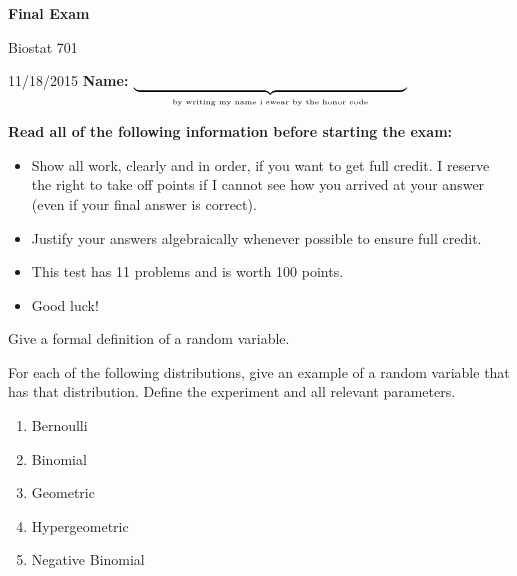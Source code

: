 \documentclass{article}
\begin{document}

\centerline{\huge \bf Final Exam}        %
\vfill \vfill
   
Biostat 701                               %

11/18/2015 \hfill                             %
{\bf Name: } $\underbrace{\hspace{2.7in}}_{\mbox{\tiny by writing my 
                                           name i swear by the honor code}}$
\vfill \vfill \vfill

{\bf Read all of the following information before starting the exam:}
\vspace{1pc}

\begin{itemize}                        %
	\item  Show all work, clearly and in order, if you want to get full
	credit.  I reserve the right to take off points if I cannot see how you 
	arrived at your answer (even if your final answer is correct).
	
	\item Justify your answers algebraically whenever possible to ensure 
	full credit. 
		
	\item  This test has 11 problems  %
	and is worth 100 points.           %
	
	\item  Good luck!
\end{itemize}

\vfill \vfill \vfill

\clearpage


\begin{problem}{5}

Give a formal definition of a random variable.
\vspace{1pc}

\end{problem}

\begin{problem}{10}

For each of the following distributions, give an example of a random variable that has that distribution. Define the experiment and all relevant parameters.

\begin{enumerate}
\item Bernoulli
\item Binomial
\item Geometric
\item Hypergeometric
\item Negative Binomial
\end{enumerate}

\end{problem}
\end{document}
